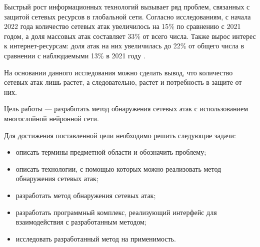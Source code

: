 
\intro


Быстрый рост информационных технологий вызывает ряд проблем, связанных с
защитой сетевых ресурсов в глобальной сети. Согласно исследованиям,
с начала 2022 года количество сетевых атак увеличилось на 15\% по сравнению
с 2021 годом, а доля массовых атак составляет 33\% от всего числа.
Также вырос интерес к интернет-ресурсам: доля атак на них увеличилась до 22\% от общего числа в сравнении с наблюдаемыми 13\% в 2021 году \cite{investigate}.

На основании данного исследования можно сделать вывод, что количество сетевых атак лишь растет, а следовательно, растет и потребность в защите от них.


Цель работы --- разработать метод обнаружения сетевых атак с использованием многослойной нейронной сети.

Для достижения поставленной цели необходимо решить следующие задачи:

\begin{itemize}
    \item описать термины предметной области и обозначить проблему;
    \item описать технологии, с помощью которых можно реализовать метод обнаружения сетевых атак;
	\item разработать метод обнаружения сетевых атак;
	\item разработать программный комплекс, реализующий интерфейс для взаимодействия с разработанным методом;
	\item исследовать разработанный метод на применимость.
\end{itemize}

